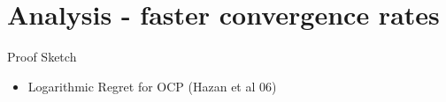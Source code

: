 \section{Analysis - faster convergence rates}
\begin{frame}{Proof Sketch}
    \begin{itemize}
        \item Logarithmic Regret for OCP (Hazan et al 06)
    \end{itemize}
\end{frame}


